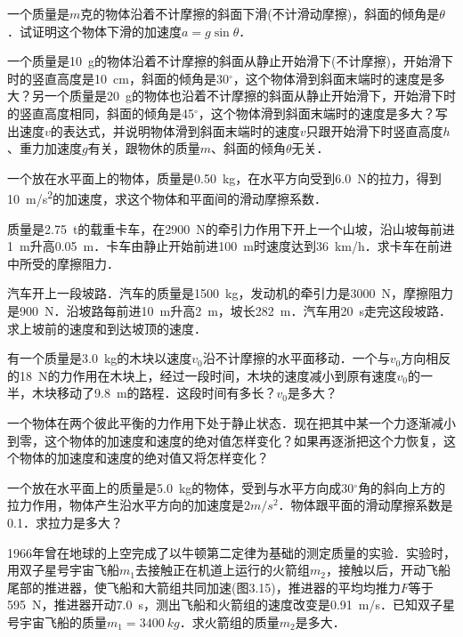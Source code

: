 \begin{Test}
\begin{QsNum}
    \item  一个质量是$m$克的物体沿着不计摩擦的斜面下滑(不计滑动摩擦)，斜面的倾角是$\theta$．试证明这个物体下滑的加速度$a=g\sin\theta$．
    \item   一个质量是\SI{10}{g}的物体沿着不计摩擦的斜面从静止开始滑下(不计摩擦)，开始滑下时的竖直高度是\SI{10}{cm}，斜面的倾角是30$^\circ$，这个物体滑到斜面末端时的速度是多大？另一个质量是\SI{20}{g}的物体也沿着不计摩擦的斜面从静止开始滑下，开始滑下时的竖直高度相同，斜面的倾角是45$^\circ$，这个物体滑到斜面末端时的速度是多大？写出速度$v$的表达式，并说明物体滑到斜面末端时的速度$v$只跟开始滑下时竖直高度$h$、重力加速度$g$有关，跟物休的质量$m$、斜面的倾角$\theta$无关．
    \item 一个放在水平面上的物体，质量是\SI{0.50}{kg}，在水平方向受到\SI{6.0}{N}的拉力，得到\SI{10}{m/s^2}的加速度，求这个物体和平面间的滑动摩擦系数．
    \item 质量是\SI{2.75}{t}的载重卡车，在\SI{2900}{N}的牵引力作用下开上一个山坡，沿山坡每前进\SI{1}{m}升高\SI{0.05}{m}．卡车由静止开始前进\SI{100}{m}时速度达到\SI{36}{km/h}．求卡车在前进中所受的摩擦阻力．
    \item 汽车开上一段坡路．汽车的质量是\SI{1500}{kg}，发动机的牵引力是\SI{3000}{N}，摩擦阻力是\SI{900}{N}．沿坡路每前进\SI{10}{m}升高\SI{2}{m}，坡长\SI{282}{m}．汽车用\SI{20}{s}走完这段坡路．求上坡前的速度和到达坡顶的速度．
    \item   有一个质量是\SI{3.0}{kg}的木块以速度$v_0$沿不计摩擦的水平面移动．一个与$v_0$方向相反的\SI{18}{N}的力作用在木块上，经过一段时间，木块的速度减小到原有速度$v_0$的一半，木块移动了\SI{9.8}{m}的路程．这段时间有多长？$v_0$是多大？
    \item   一个物体在两个彼此平衡的力作用下处于静止状态．现在把其中某一个力逐渐减小到零，这个物体的加速度和速度的绝对值怎样变化？如果再逐浙把这个力恢复，这个物体的加速度和速度的绝对值又将怎样变化？
    \item   一个放在水平面上的质量是\SI{5.0}{kg}的物体，受到与水平方向成30$^{\circ}$角的斜向上方的拉力作用，物体产生沿水平方向的加速度是2$\si{m/s^2}$．物体跟平面的滑动摩擦系数是0.1．求拉力是多大？
    \item  1966年曾在地球的上空完成了以牛顿第二定律为基础的测定质量的实验．实验时，用双子星号宇宙飞船$m_1$去接触正在机道上运行的火箭组$m_2$，接触以后，开动飞船尾部的推进器，使飞船和大箭组共同加速(图3.15)，推进器的平均均推力$F$等于\SI{595}{N}，推进器开动\SI{7.0}{s}，测出飞船和火箭组的速度改变是\SI{0.91}{m/s}．已知双子星号宇宙飞船的质量$m_1=\SI{3400}{kg}$．求火箭组的质量$m_2$是多大．
          \begin{figure}[H]\centering
              \caption{}
          \end{figure}


\end{QsNum}
\end{Test}

